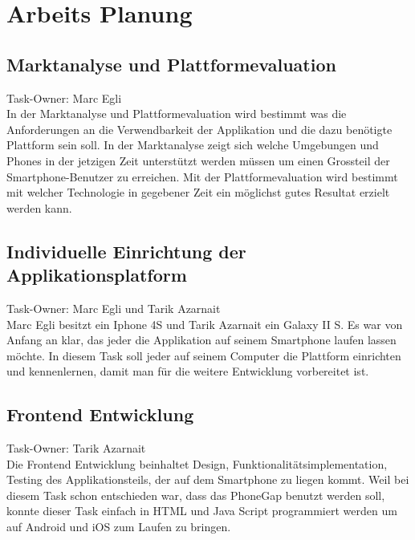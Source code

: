 
\newpage
\section{Arbeits Planung} %
\label{sec:arbeits_planung}

\subsection{Marktanalyse und Plattformevaluation} %
\label{sub:marktanalyse_und_platformevaluation}
Task-Owner: Marc Egli\\
In der Marktanalyse und Plattformevaluation wird bestimmt was die Anforderungen an die Verwendbarkeit der Applikation und die dazu benötigte Plattform sein soll. In der Marktanalyse zeigt sich welche Umgebungen und Phones in der jetzigen Zeit unterstützt werden müssen um einen Grossteil der Smartphone-Benutzer zu erreichen. Mit der Plattformevaluation wird bestimmt mit welcher Technologie in gegebener Zeit ein möglichst gutes Resultat erzielt werden kann.

\subsection{Individuelle Einrichtung der Applikationsplatform} %
\label{sub:individuelle_einrichtung_der_applikationsplatform}
Task-Owner: Marc Egli und Tarik Azarnait\\
Marc Egli besitzt ein Iphone 4S und Tarik Azarnait ein Galaxy II S. Es war von Anfang an klar, das jeder die Applikation auf seinem Smartphone laufen lassen möchte. In diesem Task soll jeder auf seinem Computer die Plattform einrichten und kennenlernen, damit man für die weitere Entwicklung vorbereitet ist. 

\subsection{Frontend Entwicklung} %
\label{sub:frontend_entwicklung}
Task-Owner: Tarik Azarnait\\
Die Frontend Entwicklung beinhaltet Design, Funktionalitätsimplementation, Testing des Applikationsteils, der auf dem Smartphone zu liegen kommt. Weil bei diesem Task schon entschieden war, dass das PhoneGap benutzt werden soll, konnte dieser Task einfach in HTML und Java Script programmiert werden um auf Android und iOS zum Laufen zu bringen. 

